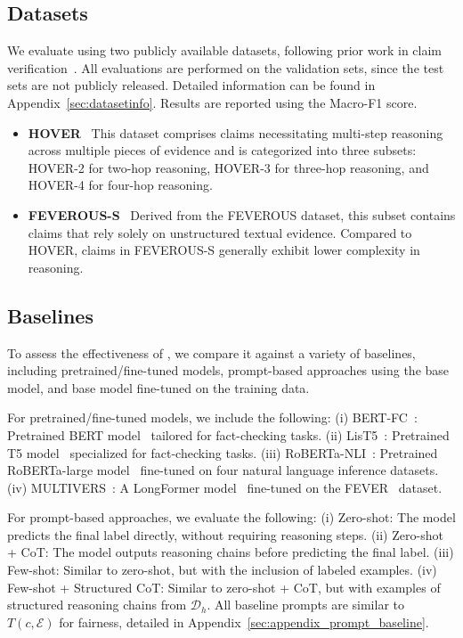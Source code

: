 \subsection{Datasets}
We evaluate \themodel using two publicly available datasets, following prior work in claim verification~\cite{gong2024navigating}. All evaluations are performed on the validation sets, since the test sets are not publicly released. Detailed information can be found in Appendix~\ref{sec:datasetinfo}. Results are reported using the Macro-F1 score.
\begin{itemize}
\item \textbf{HOVER}~\cite{jiang2020hover} \xspace This dataset comprises claims necessitating multi-step reasoning across multiple pieces of evidence and is categorized into three subsets: HOVER-2 for two-hop reasoning, HOVER-3 for three-hop reasoning, and HOVER-4 for four-hop reasoning.
\item \textbf{FEVEROUS-S}~\cite{aly2021feverous} \xspace Derived from the FEVEROUS dataset, this subset contains claims that rely solely on unstructured textual evidence. Compared to HOVER, claims in FEVEROUS-S generally exhibit lower complexity in reasoning.  
\end{itemize}

\subsection{Baselines}
To assess the effectiveness of \themodel, we compare it against a variety of baselines, including pretrained/fine-tuned models, prompt-based approaches using the base model, and base model fine-tuned on the training data.

For pretrained/fine-tuned models, we include the following: (i) BERT-FC~\cite{soleimani2020bert}: Pretrained BERT model~\cite{devlin2018bert} tailored for fact-checking tasks. (ii) LisT5~\cite{jiang2021exploring}: Pretrained T5 model~\cite{raffel2020exploring} specialized for fact-checking tasks. (iii) RoBERTa-NLI~\cite{nie2020adversarial}: Pretrained RoBERTa-large model~\cite{liu2019roberta} fine-tuned on four natural language inference datasets. (iv) MULTIVERS~\cite{wadden2022multivers}: A LongFormer model~\cite{beltagy2020longformer} fine-tuned on the FEVER~\cite{thorne2018fever} dataset.

For prompt-based approaches, we evaluate the following: (i) Zero-shot: The model predicts the final label directly, without requiring reasoning steps. (ii) Zero-shot + CoT: The model outputs reasoning chains before predicting the final label. (iii) Few-shot: Similar to zero-shot, but with the inclusion of labeled examples. (iv) Few-shot + Structured CoT: Similar to zero-shot + CoT, but with examples of structured reasoning chains from $\mathcal{D}_h$. All baseline prompts are similar to $T(c,\mathcal{E})$ for fairness, detailed in Appendix~\ref{sec:appendix_prompt_baseline}.

